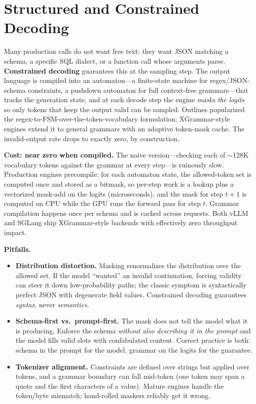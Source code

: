 \section{Structured and Constrained Decoding}
\label{sec:structured_decoding}

Many production calls do not want free text: they want JSON matching a schema, a specific SQL dialect, or a function call whose arguments parse. \textbf{Constrained decoding} guarantees this at the sampling step. The output language is compiled into an automaton---a finite-state machine for regex/JSON-schema constraints, a pushdown automaton for full context-free grammars---that tracks the generation state, and at each decode step the engine \textit{masks the logits} so only tokens that keep the output valid can be sampled. Outlines popularized the regex-to-FSM-over-the-token-vocabulary formulation; XGrammar-style engines extend it to general grammars with an adaptive token-mask cache. The invalid-output rate drops to exactly zero, by construction.

\textbf{Cost: near zero when compiled.} The naive version---checking each of $\sim$128K vocabulary tokens against the grammar at every step---is ruinously slow. Production engines precompile: for each automaton state, the allowed-token set is computed once and stored as a bitmask, so per-step work is a lookup plus a vectorized mask-add on the logits (microseconds), and the mask for step $t+1$ is computed on CPU while the GPU runs the forward pass for step $t$. Grammar compilation happens once per schema and is cached across requests. Both vLLM and SGLang ship XGrammar-style backends with effectively zero throughput impact.

\textbf{Pitfalls.}
\begin{itemize}
    \item \textbf{Distribution distortion.} Masking renormalizes the distribution over the allowed set. If the model ``wanted'' an invalid continuation, forcing validity can steer it down low-probability paths; the classic symptom is syntactically perfect JSON with degenerate field values. Constrained decoding guarantees \textit{syntax}, never \textit{semantics}.
    \item \textbf{Schema-first vs.\ prompt-first.} The mask does not tell the model what it is producing. Enforce the schema \textit{without also describing it in the prompt} and the model fills valid slots with confabulated content. Correct practice is both: schema in the prompt for the model, grammar on the logits for the guarantee.
    \item \textbf{Tokenizer alignment.} Constraints are defined over strings but applied over tokens, and a grammar boundary can fall mid-token (one token may span a quote and the first characters of a value). Mature engines handle the token/byte mismatch; hand-rolled maskers reliably get it wrong.
\end{itemize}

